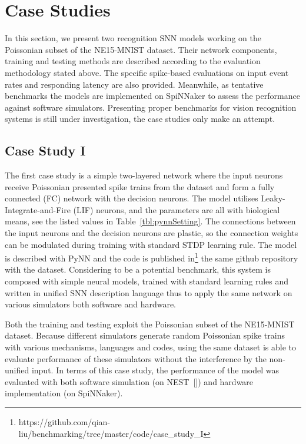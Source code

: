 \section{Case Studies}
\label{sec:test}
In this section, we present two recognition SNN models working on the Poissonian subset of the NE15-MNIST dataset.
Their network components, training and testing methods are described according to the evaluation methodology stated above.
The specific spike-based evaluations on input event rates and responding latency are also provided. 
Meanwhile, as tentative benchmarks the models are implemented on SpiNNaker to assess the performance against software simulators.
Presenting proper benchmarks for vision recognition systems is still under investigation, the case studies only make an attempt.

\subsection{Case Study I}
The first case study is a simple two-layered network where the input neurons receive Poissonian presented spike trains from the dataset and form a fully connected (FC) network with the decision neurons.
The model utilises Leaky-Integrate-and-Fire (LIF) neurons, and the parameters are all with biological means, see the listed values in Table~\ref{tbl:pynnSetting}.
The connections between the input neurons and the decision neurons are plastic, so the connection weights can be modulated during training with standard STDP learning rule.
The model is described with PyNN and the code is published in\footnote {https://github.com/qian-liu/benchmarking/tree/master/code/case\_study\_I} the same github repository with the dataset.
Considering to be a potential benchmark, this system is composed with simple neural models, trained with standard learning rules and written in unified SNN description language thus to apply the same network on various simulators both software and hardware.

Both the training and testing exploit the Poissonian subset of the NE15-MNIST dataset.
Because different simulators generate random Poissonian spike trains with various mechanisms, languages and codes, using the same dataset is able to evaluate performance of these simulators without the interference by the non-unified input.
In terms of this case study, the performance of the model was evaluated with both software simulation (on NEST~[\cite{gewaltig2007nest}]) and hardware implementation (on SpiNNaker).

